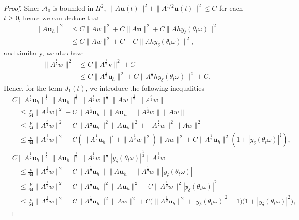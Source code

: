 \documentclass{elsarticle}
\theoremstyle{definition}
\numberwithin{equation}{section}
\begin{document}
\begin{proof}
Since $\mathcal{A}_0$ is bounded in $H^2$,  $\|A\textbf{u}(t) \|^2+\|A^{1/2}\textbf{u}(t) \|^2\leq C$ for each $t\geq 0$, hence we can deduce that
\begin{align}\label{4.15}
\|A\textbf{u}_h\|^2&\leq C\|Aw\|^2+C\|A\textbf{u}\|^2
 +  C\|Ahy_\delta(\theta_t\omega)\|^2 \nonumber \\
&
\leq C\|Aw\|^2+  C  +C \|Ahy_\delta(\theta_t\omega)\|^2
,
\end{align}
and similarly, we also have
\begin{align}  \label{mar5.3}
  \|A^{\frac 12}w\|^2
   &\leq  C\|A^{\frac 12} \textbf{v}\|^2 +C
   \nonumber  \\
   &\leq C\|A^{\frac 12} \textbf{u}_h\|^2 + C\|A^{\frac 12} hy_\delta(\theta_t\omega) \|^2 +C .
\end{align}
Hence,  for  the term $J_1(t)$, we introduce the following inequalities
\begin{align*}
  &C\|A^\frac12\textbf{u}_h\|^\frac12\|A\textbf{u}_h\|^\frac12\|A^\frac12w\|^\frac12
\|Aw\|^\frac12\|A^\frac32w\|
& \nonumber\\
&\quad  \leq    \frac \nu {64}\|A^\frac32w\|^2  + C \|A^\frac12\textbf{u}_h\|  \|A \textbf{u}_h\|   \|A^{\frac 12} w\|  \|Aw\|
\nonumber
\\
&\quad  \leq   \frac \nu {64}\|A^\frac32w\|^2
+ C \|A^\frac12\textbf{u}_h\|^2  \|A \textbf{u}_h\|^2+      \|A^{\frac 12} w\|^2 \|Aw\|^2
\nonumber
\\
&\quad  \leq    \frac \nu {64} \|A^\frac32w\|^2
+ C\left( \|A^\frac12\textbf{u}_h\|^2 +  \|A^\frac 12 w   \|^2  \right) \|A w\|^ 2
+ C  \|A^\frac12\textbf{u}_h\|^2   \left(  1+ |y_\delta(\theta_t\omega) |^2  \right) ,
\end{align*}
\begin{align*}
  &C\|A^\frac12\textbf{u}_h\|^\frac12\|A\textbf{u}_h\|^\frac12\|A^\frac12w\|^\frac12
 |y_\delta(\theta_t\omega)|^\frac12\|A^\frac32w\|
& \nonumber\\
&\quad  \leq   \frac \nu {64}\|A^\frac32w\|^2  + C \|A^\frac12\textbf{u}_h\|  \|A \textbf{u}_h\|   \|A^{\frac 12} w\| |y_\delta(\theta_t\omega) |
\nonumber
\\
& \quad  \leq    \frac \nu {64}\|A^\frac32w\|^2
+ C \|A^\frac12\textbf{u}_h\|^2  \|A \textbf{u}_h\|^2+   C   \|A^{\frac 12} w\|^2 |y_\delta(\theta_t\omega) |^2
\nonumber
\\
&\quad \leq      \frac \nu {64}\|A^\frac32w\|^2
+ C  \|A^\frac12\textbf{u}_h\|^2  \|A w\|^2  + C \big(  \|A^\frac12\textbf{u}_h\|^2 +|y_\delta(\theta_t\omega) |^2 +1\big) \big(  1+|y_\delta(\theta_t\omega) |^2  \big)  ,
\end{align*}


\end{proof}
\end{document}
